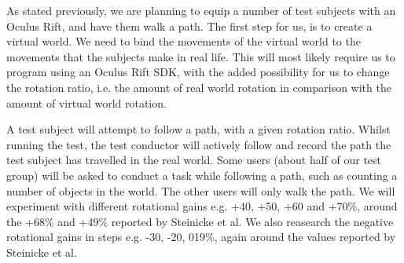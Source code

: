 As stated previously, we are planning to equip a number of test subjects with an Oculus Rift, and have them walk a path.
The first step for us, is to create a virtual world.
We need to bind the movements of the virtual world to the movements that the subjects make in real life.
This will most likely require us to program using an Oculus Rift SDK, with the added possibility for us to change the rotation ratio, i.e. the amount of real world rotation in comparison with the amount of virtual world rotation.

A test subject will attempt to follow a path, with a given rotation ratio.
Whilst running the test, the test conductor will actively follow and record the path the test subject has travelled in the real world. 
Some users (about half of our test group) will be asked to conduct a task while following a path, such as counting a number of objects in the world.
The other users will only walk the path.
We will experiment with different rotational gains e.g. +40, +50, +60 and +70\%, around the +68\% and +49\% reported by Steinicke et al.
We also reasearch the negative rotational gains in steps e.g. -30, -20, 019\%, again around the values reported by Steinicke et al.
